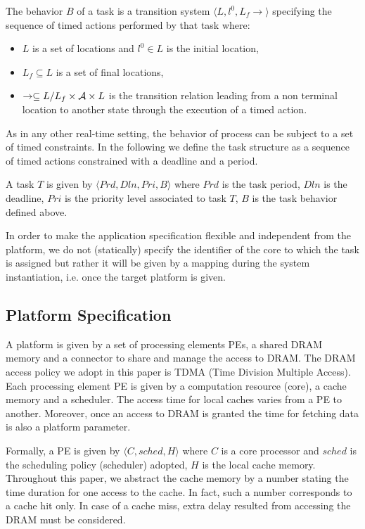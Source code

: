 \begin{definition}
The behavior $B$ of a task is a transition system $\langle L,l^0,L_f\rightarrow\rangle$ specifying the sequence of timed actions performed by that task where:
\begin{itemize}
\item $L$ is a set of locations and $l^0\in L$ is the initial location,
\item $L_f\subseteq L$ is a set of final locations,
\item $\rightarrow \subseteq L/L_f\times {\cal A}\times L$ is the transition relation leading from a non terminal location to another state through the execution of a timed action. 
\end{itemize} 
\end{definition}

As in any other real-time setting, the behavior of process can be subject to a set of timed constraints. In the following we define the task structure as a sequence of timed actions constrained with a deadline and a period.

\begin{definition} A task $T$ is given by $\langle Prd, Dln, Pri, B\rangle$ where $Prd$ is the task period, $Dln$ is the deadline, $Pri$ is the priority level associated to task $T$, $B$ is the task behavior defined above. 
\end{definition}
In order to make the application specification flexible and independent from the platform, we do not (statically) specify the identifier of the core to which the task is assigned but rather it will be given by a mapping during the system instantiation, i.e. once the target platform is given.  

\subsection{Platform Specification}
A platform is given by a set of processing elements PEs, a shared DRAM memory and a connector to share and manage the access to DRAM. The DRAM access policy we adopt in this paper is TDMA (Time Division Multiple Access).  
Each processing element PE is given by a computation resource (core), a cache memory and a scheduler. The access time for local caches varies from a PE to another. Moreover, once an access to DRAM is granted the time for fetching data is also a platform 
 parameter.

Formally, a PE is given by $\langle C, sched, H\rangle$ where $C$ is a core processor and $sched$ is the scheduling policy (scheduler) adopted, $H$ is the local cache memory. Throughout this paper, we abstract the cache memory by a number stating the time duration for one access to the cache. In fact, such a number corresponds to a cache hit only. In case of a cache miss, extra delay resulted from accessing the DRAM must be considered. 

